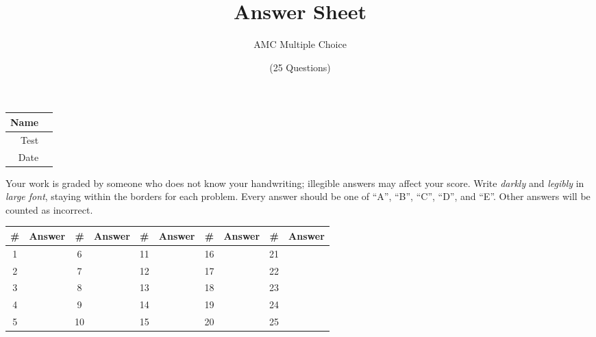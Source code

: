 \documentclass[a4paper, 12pt]{article}
\title{Answer Sheet}
\author{AMC Multiple Choice}
\date{(25 Questions)}
\begin{document}
\maketitle

\begin{center}
	\begin{tabular}{|r|r|}\hline
		\hspace{3em} Name & \hspace{30em} \\\hline
		Test & \qquad \\ \hline
		Date & \qquad \\ \hline
	\end{tabular}
\end{center}

Your work is graded by someone who does not know your handwriting; illegible answers may affect your score. Write \emph{darkly} and \emph{legibly} in \emph{large font}, staying within the borders for each problem. Every answer should be one of ``A'', ``B'', ``C'', ``D'', and ``E''. Other answers will be counted as incorrect.

\begin{center}
	\begin{tabularx}{\textwidth}{|c|X|c|X|c|X|c|X|c|X|}\hline
		\# & Answer & \# & Answer & \# & Answer & \# & Answer & \# & Answer \\\hline
		1 & & 6 & & 11 & & 16 & & 21 & \\\hline
		2 & & 7 & & 12 & & 17 & & 22 & \\\hline
		3 & & 8 & & 13 & & 18 & & 23 & \\\hline
		4 & & 9 & & 14 & & 19 & & 24 & \\\hline
		5 & & 10 & & 15 & & 20 & & 25 & \\\hline
	\end{tabularx}
\end{center}
\end{document}
